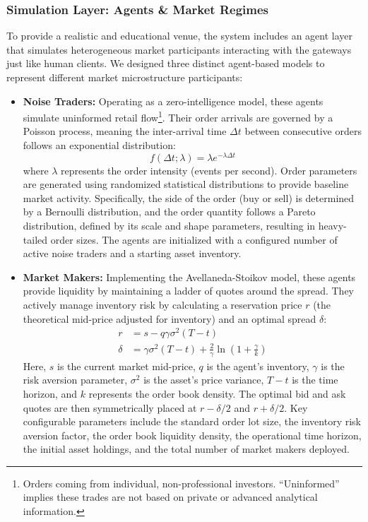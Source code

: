 \documentclass[12pt,a4paper]{article}
\begin{document}
\subsubsection{Simulation Layer: Agents \& Market Regimes}
To provide a realistic and educational venue, the system includes an agent layer that simulates heterogeneous market participants interacting with the gateways just like human clients. We designed three distinct agent-based models to represent different market microstructure participants:
\begin{itemize}
    \item \textbf{Noise Traders:} Operating as a zero-intelligence model, these agents simulate uninformed retail flow\footnote{Orders coming from individual, non-professional investors. ``Uninformed'' implies these trades are not based on private or advanced analytical information.}. Their order arrivals are governed by a Poisson process, meaning the inter-arrival time $\Delta t$ between consecutive orders follows an exponential distribution:
    \begin{equation}
        f(\Delta t; \lambda) = \lambda e^{-\lambda \Delta t}
    \end{equation}
    where $\lambda$ represents the order intensity (events per second). Order parameters are generated using randomized statistical distributions to provide baseline market activity. Specifically, the side of the order (buy or sell) is determined by a Bernoulli distribution, and the order quantity follows a Pareto distribution, defined by its scale and shape parameters, resulting in heavy-tailed order sizes. The agents are initialized with a configured number of active noise traders and a starting asset inventory.
    \item \textbf{Market Makers:} Implementing the Avellaneda-Stoikov model, these agents provide liquidity by maintaining a ladder of quotes around the spread. They actively manage inventory risk by calculating a reservation price $r$ (the theoretical mid-price adjusted for inventory) and an optimal spread $\delta$:
    \begin{align}
        r &= s - q \gamma \sigma^2 (T - t) \\
        \delta &= \gamma \sigma^2 (T - t) + \frac{2}{\gamma} \ln\left(1 + \frac{\gamma}{k}\right)
    \end{align}
    Here, $s$ is the current market mid-price, $q$ is the agent's inventory, $\gamma$ is the risk aversion parameter, $\sigma^2$ is the asset's price variance, $T - t$ is the time horizon, and $k$ represents the order book density. The optimal bid and ask quotes are then symmetrically placed at $r - \delta/2$ and $r + \delta/2$. Key configurable parameters include the standard order lot size, the inventory risk aversion factor, the order book liquidity density, the operational time horizon, the initial asset holdings, and the total number of market makers deployed.

\end{itemize}
\end{document}
